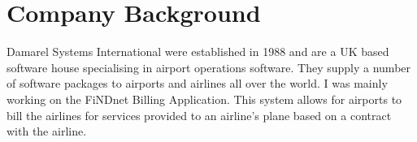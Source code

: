 \section{Company Background}
{
	Damarel Systems International were established in 1988 and are a UK based software house specialising in airport operations software. They supply a number of software packages to airports and airlines all over the world. I was mainly working on the FiNDnet Billing Application. This system allows for airports to bill the airlines for  services provided to an airline's plane based on a contract with the airline. 
}